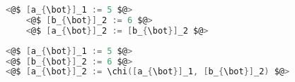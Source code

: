 \noindent\begin{minipage}{.45\textwidth}
	\begin{lstlisting}[caption={The memory location a and b are referencing to the same location.}, label={lst:chi_function}, frame=tlrb, language=C]
	<@$ [a_{\bot}]_1 := 5 $@>
	<@$ [b_{\bot}]_2 := 6 $@>
	<@$ [a_{\bot}]_2 := [b_{\bot}]_2 $@>
	\end{lstlisting}
\end{minipage}\hfill
\begin{minipage}{.45\textwidth}
	\begin{lstlisting}[caption={The memory location a and b \textbf{may} be referencing to the same location.}, label={lst:chi_function}, frame=tlrb, language=C]
<@$ [a_{\bot}]_1 := 5 $@>
<@$ [b_{\bot}]_2 := 6 $@>
<@$ [a_{\bot}]_2 := \chi([a_{\bot}]_1, [b_{\bot}]_2) $@>
	\end{lstlisting}
\end{minipage}